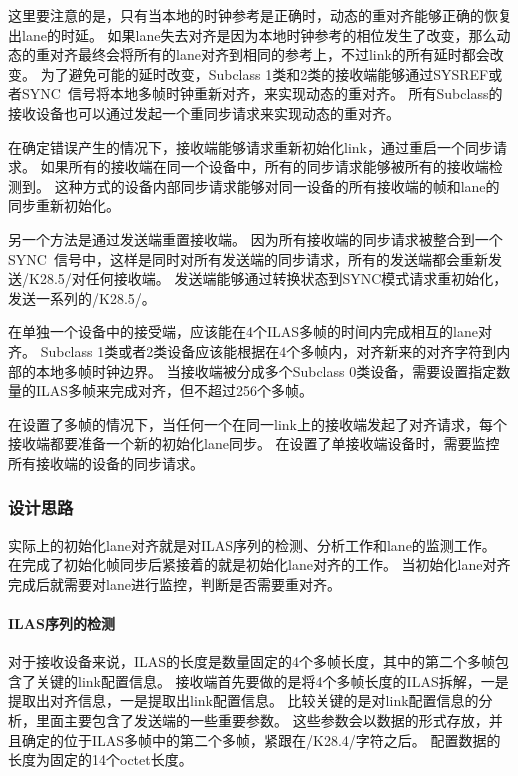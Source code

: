 \documentclass[UTF8]{ctexart}
\begin{document}
这里要注意的是，只有当本地的时钟参考是正确时，动态的重对齐能够正确的恢复出lane的时延。
如果lane失去对齐是因为本地时钟参考的相位发生了改变，那么动态的重对齐最终会将所有的lane对齐到相同的参考上，不过link的所有延时都会改变。
为了避免可能的延时改变，Subclass 1类和2类的接收端能够通过SYSREF或者SYNC~信号将本地多帧时钟重新对齐，来实现动态的重对齐。
所有Subclass的接收设备也可以通过发起一个重同步请求来实现动态的重对齐。

在确定错误产生的情况下，接收端能够请求重新初始化link，通过重启一个同步请求。
如果所有的接收端在同一个设备中，所有的同步请求能够被所有的接收端检测到。
这种方式的设备内部同步请求能够对同一设备的所有接收端的帧和lane的同步重新初始化。

另一个方法是通过发送端重置接收端。
因为所有接收端的同步请求被整合到一个SYNC~信号中，这样是同时对所有发送端的同步请求，所有的发送端都会重新发送/K28.5/对任何接收端。
发送端能够通过转换状态到SYNC模式请求重初始化，发送一系列的/K28.5/。

在单独一个设备中的接受端，应该能在4个ILAS多帧的时间内完成相互的lane对齐。
Subclass 1类或者2类设备应该能根据在4个多帧内，对齐新来的对齐字符到内部的本地多帧时钟边界。
当接收端被分成多个Subclass 0类设备，需要设置指定数量的ILAS多帧来完成对齐，但不超过256个多帧。

在设置了多帧的情况下，当任何一个在同一link上的接收端发起了对齐请求，每个接收端都要准备一个新的初始化lane同步。
在设置了单接收端设备时，需要监控所有接收端的设备的同步请求。

\subsubsection{设计思路}

实际上的初始化lane对齐就是对ILAS序列的检测、分析工作和lane的监测工作。
在完成了初始化帧同步后紧接着的就是初始化lane对齐的工作。
当初始化lane对齐完成后就需要对lane进行监控，判断是否需要重对齐。

\paragraph{ILAS序列的检测}

对于接收设备来说，ILAS的长度是数量固定的4个多帧长度，其中的第二个多帧包含了关键的link配置信息。
接收端首先要做的是将4个多帧长度的ILAS拆解，一是提取出对齐信息，一是提取出link配置信息。
比较关键的是对link配置信息的分析，里面主要包含了发送端的一些重要参数。
这些参数会以数据的形式存放，并且确定的位于ILAS多帧中的第二个多帧，紧跟在/K28.4/字符之后。
配置数据的长度为固定的14个octet长度。
\end{document}

